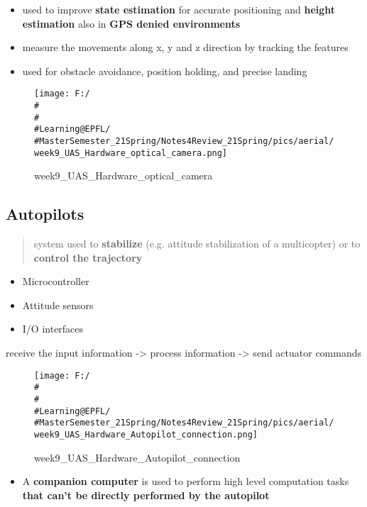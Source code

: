 \documentclass[]{article}
\begin{document}
\begin{itemize}
\item
  used to improve \textbf{state estimation} for accurate positioning and
  \textbf{height estimation} also in \textbf{GPS denied environments}
\item
  measure the movements along x, y and z direction by tracking the
  features
\item
  used for obstacle avoidance, position holding, and precise landing
\end{itemize}

\begin{figure}
\centering
\texttt{[image: F:/\\\#\\\#\\\#Learning@EPFL/\\\#MasterSemester\_21Spring/Notes4Review\_21Spring/pics/aerial/week9\_UAS\_Hardware\_optical\_camera.png]}
\caption{week9\_UAS\_Hardware\_optical\_camera}
\end{figure}

\subsection{Autopilots}\label{header-n2310}

\begin{quote}
system used to \textbf{stabilize} (e.g. attitude stabilization of a
multicopter) or to \textbf{control the trajectory}
\end{quote}

\begin{itemize}
\item
  Microcontroller
\item
  Attitude sensors
\item
  I/O interfaces
\end{itemize}

receive the input information -\textgreater{} process information
-\textgreater{} send actuator commands

\begin{figure}
\centering
\texttt{[image: F:/\\\#\\\#\\\#Learning@EPFL/\\\#MasterSemester\_21Spring/Notes4Review\_21Spring/pics/aerial/week9\_UAS\_Hardware\_Autopilot\_connection.png]}
\caption{week9\_UAS\_Hardware\_Autopilot\_connection}
\end{figure}

\begin{itemize}
\item
  A \textbf{companion computer} is used to perform high level
  computation tasks \textbf{that can't be directly performed by the
  autopilot}
\end{itemize}
\end{document}

